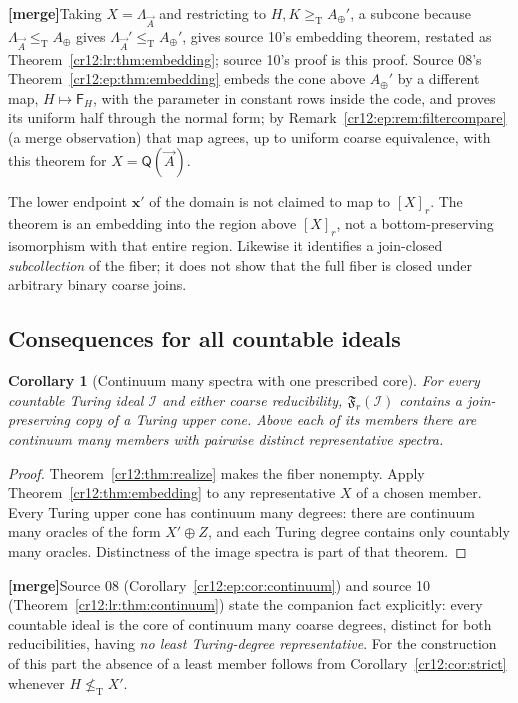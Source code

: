 \documentclass[11pt,letterpaper]{article}
\theoremstyle{plain}
\newtheorem{corollary}[theorem]{Corollary}
\theoremstyle{definition}
\theoremstyle{remark}
\numberwithin{equation}{section}
\newcommand{\leT}{\leq_{\mathrm T}}
\newcommand{\geT}{\geq_{\mathrm T}}
\newcommand{\nleT}{\nleq_{\mathrm T}}
\newcommand{\I}{\mathcal I}
\newcommand{\fiber}{\mathfrak F}
\newcommand{\mergenote}[1]{\par\smallskip\noindent
 {\small\textsf{\textbf{[merge]}}\enspace #1}\par\smallskip}
\newcommand{\Aplus}{A_{\oplus}}          %
\newcommand{\QQ}{\mathsf Q}              %
\newcommand{\Fint}{\mathsf F}            %
\newcommand{\Lam}{\Lambda_{\vec A}}      %
\begin{document}
\mergenote{Taking $X=\Lam$ and restricting to $H,K\geT\Aplus'$, a subcone because
$\Lam\leT\Aplus$ gives $\Lam'\leT\Aplus'$, gives source 10's embedding theorem,
restated as Theorem~\ref{cr12:lr:thm:embedding}; source 10's proof is this proof.
Source 08's Theorem~\ref{cr12:ep:thm:embedding} embeds the cone above $\Aplus'$ by a
different map, $H\mapsto\Fint_H$, with the parameter in constant rows inside the code,
and proves its uniform half through the normal form; by
Remark~\ref{cr12:ep:rem:filtercompare} (a merge observation) that map agrees, up to
uniform coarse equivalence, with this theorem for $X=\QQ(\vec A)$.}

The lower endpoint $\mathbf x'$ of the domain is not claimed to map to
$[X]_r$. The theorem is an embedding into the region above $[X]_r$, not a
bottom-preserving isomorphism with that entire region. Likewise it identifies a
join-closed \emph{subcollection} of the fiber; it does not show that the full
fiber is closed under arbitrary binary coarse joins.

\subsection{Consequences for all countable ideals}
\begin{corollary}[Continuum many spectra with one prescribed core]\label{cr12:cor:continuum}
For every countable Turing ideal $\I$ and either coarse reducibility,
$\fiber_r(\I)$ contains a join-preserving copy of a Turing upper cone. Above
each of its members there are continuum many members with pairwise distinct
representative spectra.
\end{corollary}
\begin{proof}
Theorem~\ref{cr12:thm:realize} makes the fiber nonempty. Apply
Theorem~\ref{cr12:thm:embedding} to any representative $X$ of a chosen member.
Every Turing upper cone has continuum many degrees: there are continuum many
oracles of the form $X'\oplus Z$, and each Turing degree contains only
countably many oracles. Distinctness of the image spectra is part of that theorem.
\end{proof}
\mergenote{Source 08 (Corollary~\ref{cr12:ep:cor:continuum}) and source 10
(Theorem~\ref{cr12:lr:thm:continuum}) state the companion fact explicitly: every
countable ideal is the core of continuum many coarse degrees, distinct for both
reducibilities, having \emph{no least Turing-degree representative}. For the
construction of this part the absence of a least member follows from
Corollary~\ref{cr12:cor:strict} whenever $H\nleT X'$.}
\end{document}
